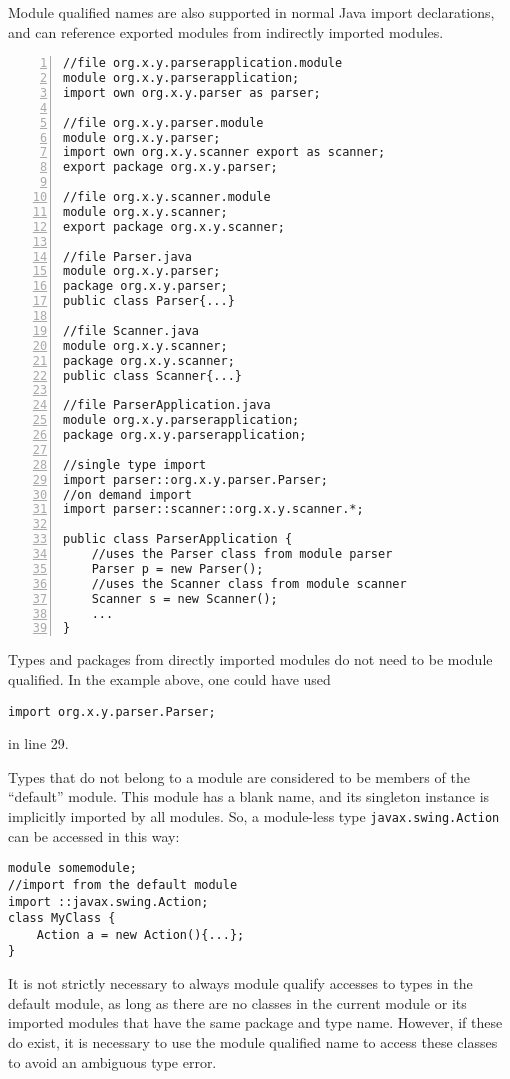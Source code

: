 Module qualified names are also supported in normal Java import declarations,
and can reference exported modules from indirectly imported modules.

\begin{lstlisting}[caption=Module Qualified Imports,numbers=left]
//file org.x.y.parserapplication.module
module org.x.y.parserapplication;
import own org.x.y.parser as parser;

//file org.x.y.parser.module
module org.x.y.parser;
import own org.x.y.scanner export as scanner;
export package org.x.y.parser;

//file org.x.y.scanner.module
module org.x.y.scanner;
export package org.x.y.scanner;

//file Parser.java
module org.x.y.parser;
package org.x.y.parser;
public class Parser{...}

//file Scanner.java
module org.x.y.scanner;
package org.x.y.scanner;
public class Scanner{...}

//file ParserApplication.java
module org.x.y.parserapplication;
package org.x.y.parserapplication;

//single type import
import parser::org.x.y.parser.Parser;
//on demand import
import parser::scanner::org.x.y.scanner.*;

public class ParserApplication {
	//uses the Parser class from module parser
	Parser p = new Parser(); 
	//uses the Scanner class from module scanner
	Scanner s = new Scanner(); 
	...
}

\end{lstlisting}

Types and packages from directly imported modules do not need to
be module qualified. In the example above, one could have used
\begin{lstlisting}
import org.x.y.parser.Parser;
\end{lstlisting}
in line 29.

Types that do not belong to a module are considered to be members of
the ``default'' module. This module has a blank name, and its singleton
instance is implicitly imported by all modules. So, a module-less
type {\tt javax.swing.Action} can be accessed in this way:

\begin{lstlisting}[caption=Default Module Lookups]
module somemodule;
//import from the default module
import ::javax.swing.Action;
class MyClass {
	Action a = new Action(){...};
}
\end{lstlisting}

It is not strictly necessary to always module qualify accesses to types in
the default module, as long as there are no classes in the current module
or its imported modules that have the same package and type name. However,
if these do exist, it is necessary to use the module qualified name to access
these classes to avoid an ambiguous type error.

